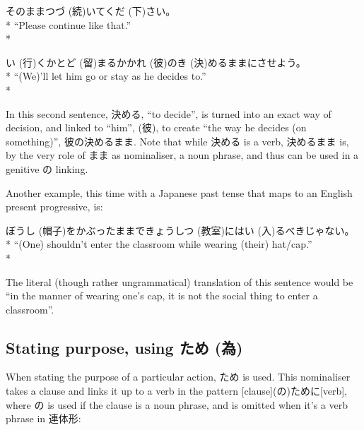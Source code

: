 \documentclass[11pt, b5paper, twoside, openright, onecolumn]{book}
\makeatletter
\newcommand*{\rubystack}[2]{{\relscale{0.5}%
  \begin{tabular}[b]{@{}c@{}}%
    {#1}\\%
   {\textscale{2}{#2}}%
  \end{tabular}}%
}
\DeclareRobustCommand*{\ruby}[2]{%
  \mbox{%
    \setlength{\parskip}{0ex}%
    \BeginAccSupp{method=pdfstringdef,ActualText={#1}}%
      \rubystack{\phantom{#2}}{#1}%
      \llap{%
        \rubystack{#2}{\phantom{#1}}%
      }%
    \EndAccSupp{}%
  }%
}
\renewcommand*{\ruby}[2]{#2 (#1)}%
\newenvironment{exampleblock}{
\setlength{\parindent}{0.6in}
\begin{minipage}[t]{\dimexpr\textwidth-\parindent}}
{\end{minipage}}
\makeatother
\begin{document}
\vspace{0.4cm}
\begin{exampleblock}
そのまま\ruby{続}{つづ}いて\ruby{下}{くだ}さい。 \\* 
“Please continue like that.” \\* 
\end{exampleblock}
\vspace{0.2cm}

\begin{exampleblock}
\ruby{行}{い}くか\ruby{留}{とど}まるか\ruby{彼}{かれ}の\ruby{決}{き}めるままにさせよう。 \\* 
“(We)’ll let him go or stay as he decides to.” \\* 
\end{exampleblock}
\vspace{0.2cm}

In this second sentence‚ 決める‚ “to decide”‚ is turned into an exact way of decision‚ and linked to “him”‚ (彼)‚ to create “the way he decides (on something)”‚ 彼の決めるまま. Note that while 決める is a verb‚ 決めるまま is‚ by the very role of まま as nominaliser‚ a noun phrase‚ and thus can be used in a genitive の linking.

Another example‚ this time with a Japanese past tense that maps to an English present progressive‚ is:

\vspace{0.4cm}
\begin{exampleblock}
\ruby{帽子}{ぼうし}をかぶったままで\ruby{教室}{きょうしつ}に\ruby{入}{はい}るべきじゃない。 \\* 
“(One) shouldn’t enter the classroom while wearing (their) hat/cap.” \\* 
\end{exampleblock}
\vspace{0.2cm}

The literal (though rather ungrammatical) translation of this sentence would be “in the manner of wearing one’s cap‚ it is not the social thing to enter a classroom”.

\subsection{Stating purpose‚ using \ruby{為}{ため}}

When stating the purpose of a particular action‚ ため is used. This nominaliser takes a clause and links it up to a verb in the pattern [clause](の)ために[verb]‚ where の is used if the clause is a noun phrase‚ and is omitted when it’s a verb phrase in 連体形:
\end{document}
